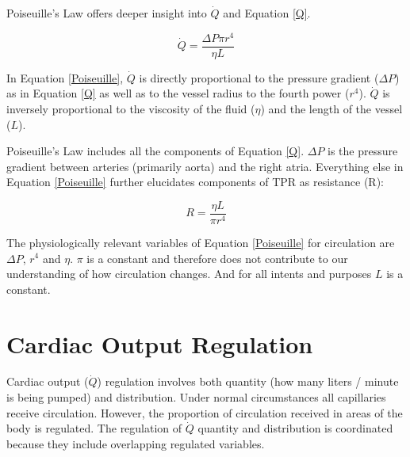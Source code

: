 Poiseuille's Law offers deeper insight into $\dot{Q}$ and Equation \ref{Q}.

\begin{equation}
    \dot{Q} = \frac{\Delta P \pi r^4}{\eta L}
    \label{Poiseuille}
\end{equation}

In Equation \ref{Poiseuille}, $\dot{Q}$ is directly proportional to the pressure gradient ($\Delta P$) as in Equation \ref{Q} as well as to the vessel radius to the fourth power ($r^4$). $\dot{Q}$ is inversely proportional to the viscosity of the fluid ($\eta$) and the length of the vessel ($L$). 

Poiseuille's Law includes all the components of Equation \ref{Q}. $\Delta P$ is the pressure gradient between arteries (primarily aorta) and the right atria. Everything else in Equation \ref{Poiseuille} further elucidates components of TPR as resistance (R):

\begin{equation}
    R = \frac{\eta L}{\pi r^4}
    \label{resistance}
\end{equation}

The physiologically relevant variables of Equation \ref{Poiseuille} for circulation are $\Delta P$, $r^4$ and $\eta$. $\pi$ is a constant and therefore does not contribute to our understanding of how circulation changes. And for all intents and purposes $L$ is a constant. 

\section{Cardiac Output Regulation}

Cardiac output ($\dot{Q}$) regulation involves both quantity (how many liters / minute is being pumped) and distribution. Under normal circumstances all capillaries receive circulation. However, the proportion of circulation received in areas of the body is regulated. The regulation of $\dot{Q}$ quantity and distribution is coordinated because they include overlapping regulated variables. 

